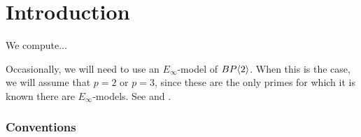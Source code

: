 
\section{Introduction}

We compute...

Occasionally, we will need to use an $E_\infty$-model of $BP\langle 2 \rangle$. When this is the case, we will assume that $p=2$ or $p=3$, since these are the only primes for which it is known there are $E_\infty$-models. See \cite{HillLawson} and \cite{LawsonNaumann}.

\subsubsection*{Conventions}
